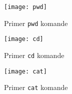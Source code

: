 \begin{figure}[H]
	\centering
	\texttt{[image: pwd]}
	\caption{Primer \texttt{pwd} komande}
\end{figure}
\begin{figure}[H]
	\centering
	\texttt{[image: cd]}
	\caption{Primer \texttt{cd} komande}
\end{figure}
\begin{figure}[H]
	\centering
	\texttt{[image: cat]}
	\caption{Primer \texttt{cat} komande}
\end{figure}